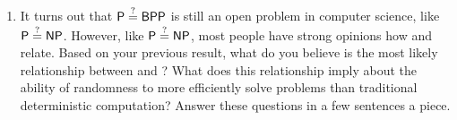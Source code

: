 \begin{problem}
\begin{enumerate}
    Formally, define a PRNG as a deterministic Turing machine \( R_k \) that
    ignores its input and writes a random number in the range of \( 0 \) to \(
    k \) to its tape.  (We will assume for simplicity's sake that \( R_k \) is
    created with an appropriate initial seed value.)  Show that if there exists
    a strong PRNG, then \( \PTIME = \BPP \)\footnote{%
      Do you believe the converse of the statement: if \( \PTIME = \BPP \) then
      there exists strong PRNGs?
    }.
  \item It turns out that \( \mathsf{P} \stackrel{?}{=} \mathsf{BPP} \) is still an open problem in
    computer science, like \( \mathsf{P} \stackrel{?}{=} \mathsf{NP} \).  However, like \( \mathsf{P}
    \stackrel{?}{=} \mathsf{NP} \), most people have strong opinions how \PTIME and \BPP relate.
    Based on your previous result, what do you believe is the most likely
    relationship between \PTIME and \BPP?  What does this relationship imply
    about the ability of randomness to more efficiently solve problems than
    traditional deterministic computation?  Answer these questions in a few
    sentences a piece.
\end{enumerate}

\answerbelow

\end{problem}



